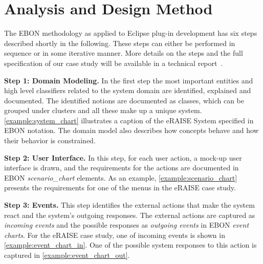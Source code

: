 \documentclass[letterpaper,conference]{IEEEtran}
\begin{document}
\section{Analysis and Design Method}
\label{sec:analys-design-meth}

The EBON methodology as applied to Eclipse plug-in development has six
steps described shortly in the following.
These steps can either be performed in sequence or in 
some iterative manner. More details on the steps
and the full specification of our case study will 
be available in a technical report~\cite{Fasie13}.


%
{\bf Step 1: Domain Modeling.} 
In the first step the most
important entities and high level classifiers related to the system
domain are identified, explained and documented. The identified
notions are documented as classes, which can be
grouped under clusters and all these make up a unique system.
\autoref{example:system_chart} illustrates a caption of the eRAISE
System specified in EBON notation.
The domain model also describes how concepts behave and how their
behavior is constrained. 




%
{\bf Step 2: User Interface.} 
In this step, for each user action, %
a mock-up user interface is drawn, and the requirements for the actions are
documented in EBON \emph{scenario\_chart} elements.
As an example, \autoref{example:scenario_chart} presents the requirements for  
one of the menus in the eRAISE case study.



%
{\bf Step 3: Events.}
This step identifies the external actions that make the system react
and the system's outgoing responses. 
The external actions are captured as \emph{incoming events} and the possible responses as \emph{outgoing events} in EBON \emph{event charts}.
For the eRAISE case study, one of incoming
events is shown in
\autoref{example:event_chart_in}.  One of the possible system responses
to this action is captured  in
\autoref{example:event_chart_out}.


\end{document}

